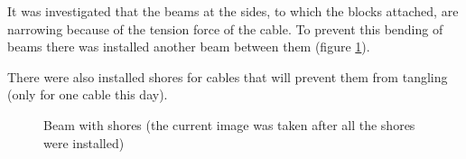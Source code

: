 It was investigated that the beams at the sides, to which the blocks attached, are narrowing because of the tension force of the cable. To prevent this bending of beams there was installed another beam between them (figure \ref{Winch2.8}).

There were also installed shores for cables that will prevent them from tangling (only for one cable this day).

\begin{figure}[H]
	\begin{minipage}[h]{1\linewidth}
		\caption{Beam with shores (the current image was taken after all the shores were installed)}
		\label{Winch2.8}
	\end{minipage}
\end{figure}
